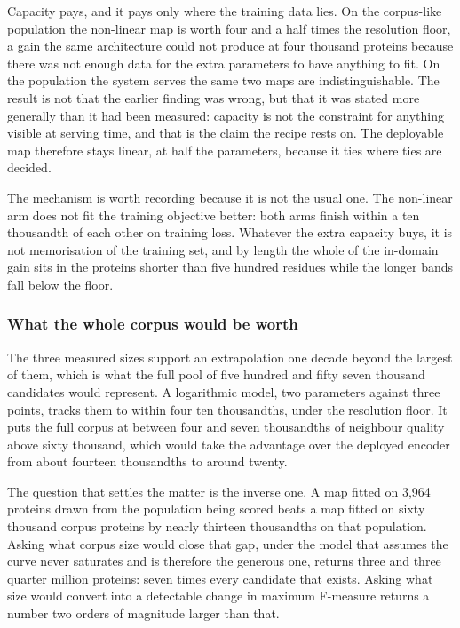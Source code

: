 \begin{table}[htbp]
  \centering
  \caption{A non-linear map against a linear one, both fitted on sixty thousand
  proteins for the same hundred passes, scored on both populations without refitting.
  $^{\dagger}$~below the resolution floor of Section~\ref{sec:exp14-floor}.}
  \label{tab:exp14-capacity}
  
\end{table}

Capacity pays, and it pays only where the training data lies. On the corpus-like
population the non-linear map is worth four and a half times the resolution floor, a
gain the same architecture could not produce at four thousand proteins because there
was not enough data for the extra parameters to have anything to fit. On the population
the system serves the same two maps are indistinguishable. The result is not that the
earlier finding was wrong, but that it was stated more generally than it had been
measured: capacity is not the constraint for anything visible at serving time, and that
is the claim the recipe rests on. The deployable map therefore stays linear, at half the
parameters, because it ties where ties are decided.

The mechanism is worth recording because it is not the usual one. The non-linear arm
does not fit the training objective better: both arms finish within a ten thousandth of
each other on training loss. Whatever the extra capacity buys, it is not memorisation of
the training set, and by length the whole of the in-domain gain sits in the proteins
shorter than five hundred residues while the longer bands fall below the floor.

\subsubsection{What the whole corpus would be worth}

The three measured sizes support an extrapolation one decade beyond the largest of them,
which is what the full pool of five hundred and fifty seven thousand candidates would
represent. A logarithmic model, two parameters against three points, tracks them to
within four ten thousandths, under the resolution floor. It puts the full corpus at
between four and seven thousandths of neighbour quality above sixty thousand, which
would take the advantage over the deployed encoder from about fourteen thousandths to
around twenty.

The question that settles the matter is the inverse one. A map fitted on 3,964 proteins
drawn from the population being scored beats a map fitted on sixty thousand corpus
proteins by nearly thirteen thousandths on that population. Asking what corpus size
would close that gap, under the model that assumes the curve never saturates and is
therefore the generous one, returns three and three quarter million proteins: seven
times every candidate that exists. Asking what size would convert into a detectable
change in maximum F-measure returns a number two orders of magnitude larger than that.

